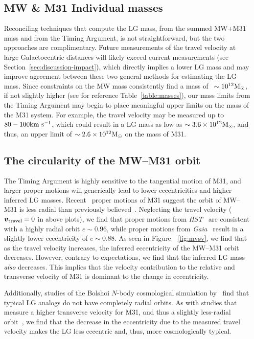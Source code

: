 \documentclass[twocolumn]{aastex631}
\newcommand{\bov}{\ensuremath{\boldsymbol{v}}}
\newcommand{\vtrav}{\ensuremath{\bov_{\rm travel}}}
\begin{document}
\subsection{MW \& M31 Individual masses}
Reconciling techniques that compute the LG mass, from the summed MW+M31 mass and
from the Timing Argument, is not straightforward, but the two approaches
are complimentary.
Future measurements of the travel velocity at large Galactocentric distances
will likely exceed current measurements (see
Section~\ref{sec:discussion-impact}), which
directly implies a lower LG mass and may improve agreement between these two
general methods for estimating the LG mass.
Since constraints on the MW mass consistently find a mass of
~$\sim10^{12}\mathrm{M}_\odot$, if not slightly higher (see for reference
Table~\ref{table:masses}), our mass limits from the Timing Argument may begin to
place meaningful upper limits on the mass of the M31 system.
For example, the travel velocity may be measured up to $80-100\mathrm{km}~\mathrm{s}^{-1}$, which could
result in a LG mass as low as $\sim3.6\times10^{12}\mathrm{M}_\odot$, and thus, an upper
limit of $\sim2.6\times10^{12}\mathrm{M}_\odot$ on the mass of M31.


\subsection{The circularity of the MW--M31 orbit}
The Timing Argument is highly sensitive to the tangential motion of M31, and
larger proper motions will generically lead to lower eccentricities and higher
inferred LG masses.
Recent \gaia\ proper motions of M31 suggest the orbit of MW--M31 is less radial
than previously believed~\citep{vdm2019,Salomon2021}.
Neglecting the travel velocity ($\vtrav=0$ in above plots), we find that proper
motions from \textit{HST}~\citep{vdm2012} are consistent with a highly radial
orbit $e\sim0.96$, while proper motions from \textit{Gaia}~\citep{Salomon2021}
result in a slightly lower eccentricity of $e\sim0.88$.
As seen in Figure~~\ref{fig:mvsv}, we find that as the travel velocity
increases, the inferred eccentricity of the MW--M31 orbit decreases.
However, contrary to expectations, we find that the inferred LG mass
\textit{also} decreases.
This implies that the velocity contribution to the relative and transverse
velocity of M31 is dominant to the change in eccentricity.

Additionally, studies of the Bolshoi $N$-body cosmological simulation
by~\cite{Forero-Romero2013} find that typical LG analogs do not have completely
radial orbits.
As with studies that measure a higher transverse velocity for M31, and thus a
slightly less-radial orbit~\citep{vdm2019,Salomon2021}, we find that the
decrease in the eccentricity due to the measured travel velocity makes the LG
less eccentric and, thus, more cosmologically typical.
\end{document}
